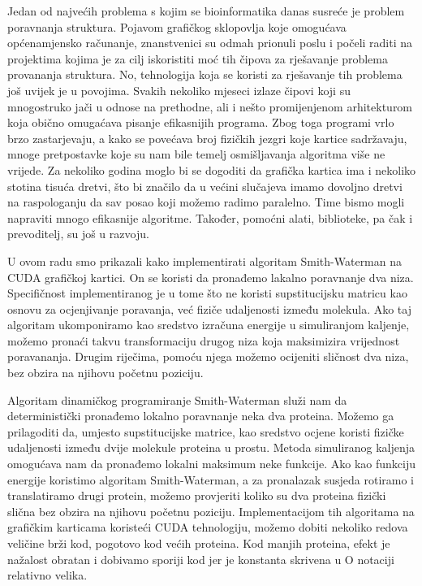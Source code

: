 \documentclass[times, utf8, zavrsni]{fer}
\begin{document}
Jedan od najvećih problema s kojim se bioinformatika danas
susreće je problem poravnanja struktura. Pojavom grafičkog sklopovlja
koje omogućava općenamjensko računanje, znanstvenici su odmah
prionuli poslu i počeli raditi na projektima kojima je za cilj
iskoristiti moć tih čipova za rješavanje problema provananja
struktura. No, tehnologija koja se koristi za rješavanje tih problema
još uvijek je u povojima. Svakih nekoliko mjeseci izlaze
čipovi koji su mnogostruko jači u odnose na prethodne, ali i
nešto promijenjenom arhitekturom koja obično omugaćava pisanje
efikasnijih programa. Zbog toga programi vrlo brzo zastarjevaju,
a kako se povećava broj fizičkih jezgri koje kartice sadržavaju,
mnoge pretpostavke koje su nam bile temelj osmišljavanja algoritma
više ne vrijede. Za nekoliko godina moglo bi se dogoditi da grafička
kartica ima i nekoliko stotina tisuća dretvi, što bi značilo
da u većini slučajeva imamo dovoljno dretvi na raspologanju
da sav posao koji možemo radimo paralelno. Time bismo mogli
napraviti mnogo efikasnije algoritme. Također, pomoćni alati,
biblioteke, pa čak i prevoditelj, su još u razvoju. 

U ovom radu smo prikazali kako implementirati algoritam Smith-Waterman
na CUDA grafičkoj kartici. On se koristi da pronađemo lakalno
poravnanje dva niza. Specifičnost implementiranog je u tome što
ne koristi supstitucijsku matricu kao osnovu za ocjenjivanje
poravanja, već fiziče udaljenosti između molekula. Ako taj algoritam
ukomponiramo kao sredstvo izračuna  energije u simuliranjom kaljenje,
možemo pronaći takvu transformaciju
drugog niza koja maksimizira vrijednost poravananja. Drugim riječima,
pomoću njega možemo ocijeniti sličnost dva niza, bez obzira na 
njihovu početnu poziciju. 


{}


\begin{sazetak}
Algoritam dinamičkog programiranje Smith-Waterman služi nam da deterministički pronađemo lokalno poravnanje neka dva proteina. 
Možemo ga prilagoditi da, umjesto supstitucijske matrice, kao sredstvo ocjene koristi fizičke udaljenosti između dvije molekule proteina u prostu.
Metoda simuliranog kaljenja omogućava nam da pronađemo lokalni maksimum neke funkcije.
Ako kao funkciju energije koristimo algoritam Smith-Waterman, a za pronalazak susjeda rotiramo i translatiramo drugi protein, možemo provjeriti koliko su dva proteina fizički slična bez obzira na njihovu početnu poziciju. 
Implementacijom tih algoritama na grafičkim karticama koristeći CUDA tehnologiju, možemo dobiti nekoliko redova veličine brži kod, pogotovo kod većih proteina.
Kod manjih proteina, efekt je nažalost obratan i dobivamo sporiji kod jer je konstanta skrivena u O notaciji relativno velika. 

\end{sazetak}
\end{document}
